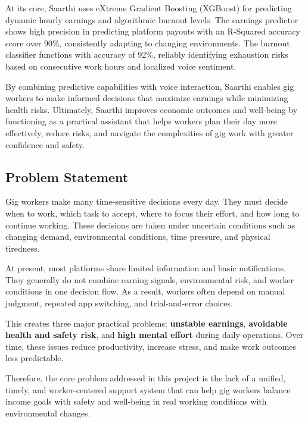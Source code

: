 \documentclass[12pt,a4paper]{article}
\begin{document}
\vspace{0.4cm}
\par\noindent
At its core, Saarthi uses eXtreme Gradient Boosting (XGBoost) for predicting dynamic hourly earnings and algorithmic burnout levels. The earnings predictor shows high precision in predicting platform payouts with an R-Squared accuracy score over 90\%, consistently adapting to changing environments. The burnout classifier functions with accuracy of 92\%, reliably identifying exhaustion risks based on consecutive work hours and localized voice sentiment.
\vspace{0.4cm}
\par\noindent
By combining predictive capabilities with voice interaction, Saarthi enables gig workers to make informed decisions that maximize earnings while minimizing health risks. Ultimately, Saarthi improves economic outcomes and well-being by functioning as a practical assistant that helps workers plan their day more effectively, reduce risks, and navigate the complexities of gig work with greater confidence and safety.
\subsection{Problem Statement}
\par\noindent
Gig workers make many time-sensitive decisions every day. They must decide when to work, which task to accept, where to focus their effort, and how long to continue working. These decisions are taken under uncertain conditions such as changing demand, environmental conditions, time pressure, and physical tiredness.
\vspace{0.4cm}
\par\noindent
At present, most platforms share limited information and basic notifications. They generally do not combine earning signals, environmental risk, and worker conditions in one decision flow. As a result, workers often depend on manual judgment, repeated app switching, and trial-and-error choices.
\vspace{0.4cm}
\par\noindent
This creates three major practical problems: \textbf{unstable earnings}, \textbf{avoidable health and safety risk}, and \textbf{high mental effort} during daily operations. Over time, these issues reduce productivity, increase stress, and make work outcomes less predictable.
\vspace{0.4cm}
\par\noindent
Therefore, the core problem addressed in this project is the lack of a unified, timely, and worker-centered support system that can help gig workers balance income goals with safety and well-being in real working conditions with environmental changes.
\end{document}
